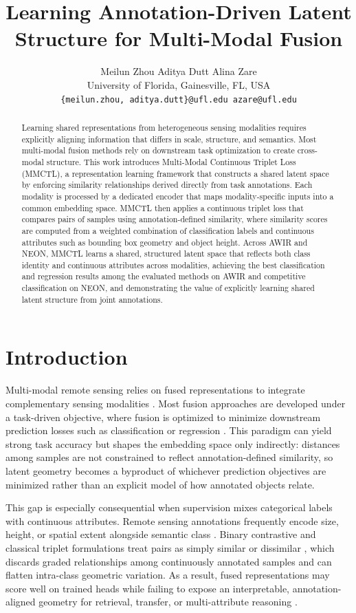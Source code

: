 \documentclass[10pt,twocolumn,letterpaper]{article}
\title{Learning Annotation-Driven Latent Structure for Multi-Modal Fusion}
\author{Meilun Zhou \quad Aditya Dutt \quad Alina Zare\\
University of Florida, Gainesville, FL, USA\\
{\tt\small \{meilun.zhou, aditya.dutt\}@ufl.edu \quad azare@ufl.edu}}
\begin{document}
\maketitle

\begin{abstract}
Learning shared representations from heterogeneous sensing modalities requires explicitly aligning information that differs in scale, structure, and semantics. Most multi-modal fusion methods rely on downstream task optimization to create cross-modal structure. This work introduces Multi-Modal Continuous Triplet Loss (MMCTL), a representation learning framework that constructs a shared latent space by enforcing similarity relationships derived directly from task annotations. Each modality is processed by a dedicated encoder that maps modality-specific inputs into a common embedding space. MMCTL then applies a continuous triplet loss that compares pairs of samples using annotation-defined similarity, where similarity scores are computed from a weighted combination of classification labels and continuous attributes such as bounding box geometry and object height. Across AWIR and NEON, MMCTL learns a shared, structured latent space that reflects both class identity and continuous attributes across modalities, achieving the best classification and regression results among the evaluated methods on AWIR and competitive classification on NEON, and demonstrating the value of explicitly learning shared latent structure from joint annotations.
\end{abstract}

\section{Introduction}
Multi-modal remote sensing relies on fused representations to integrate complementary sensing modalities \cite{chen2024novel}. Most fusion approaches are developed under a task-driven objective, where fusion is optimized to minimize downstream prediction losses such as classification or regression \cite{bai2025task}. This paradigm can yield strong task accuracy but shapes the embedding space only indirectly: distances among samples are not constrained to reflect annotation-defined similarity, so latent geometry becomes a byproduct of whichever prediction objectives are minimized rather than an explicit model of how annotated objects relate.

This gap is especially consequential when supervision mixes categorical labels with continuous attributes. Remote sensing annotations frequently encode size, height, or spatial extent alongside semantic class \cite{sun2023single}. Binary contrastive and classical triplet formulations treat pairs as simply similar or dissimilar \cite{khosla2020supervised}, which discards graded relationships among continuously annotated samples and can flatten intra-class geometric variation. As a result, fused representations may score well on trained heads while failing to expose an interpretable, annotation-aligned geometry for retrieval, transfer, or multi-attribute reasoning \cite{saidi2024deep}.
\end{document}

